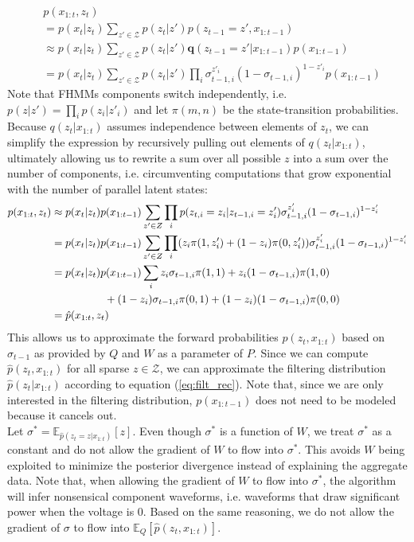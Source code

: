 \begin{align*}
&p(x_{1:t},z_t) \\
&= p(x_t|z_t) \sum_{z' \in \mathcal{Z}} p(z_t|z') p(z_{t-1} = z', x_{1:t-1})\\
			&\approx p(x_t|z_t) \sum_{z' \in \mathcal{Z}} p(z_t|z') \boldsymbol{q}(z_{t-1} = z'|x_{1:t-1})p(x_{1:t-1})\\
			&= p(x_t|z_t) \sum_{z' \in \mathcal{Z}} p(z_t|z') \prod_i \sigma_{t-1,i}^{z'_i} (1-\sigma_{t-1,i})^{1-z'_i}p(x_{1:t-1})
\end{align*}
Note that FHMMs components switch independently, i.e. $p(z|z') = \prod_i p(z_i | z'_i)$ and let $\pi(m,n)$ be the state-transition probabilities. Because $q(z_{t}|x_{1:t})$ assumes independence between elements of $z_{t}$, we can simplify the expression by recursively pulling out elements of $q(z_{t}|x_{1:t})$, ultimately allowing us to rewrite a sum over all possible $z$ into a sum over the number of components, i.e. circumventing computations that grow exponential with the number of parallel latent states:
\begin{align*}
p(x_{1:t},z_t)&\approx p(x_t| z_t)p(x_{1:t-1})\sum_{z' \in Z} \prod_i p(z_{t,i} = z_i | z_{t-1,i} = z'_i) \sigma_{t-1,i}^{z'_i} (1-\sigma_{t-1,i})^{1-z'_i}\\
&=p(x_t|z_t)p(x_{1:t-1})\sum_{z' \in Z} \prod_i (z_i \pi(1 , z'_i) + (1-z_i) \pi(0 ,z'_i))\sigma_{t-1,i}^{z'_i} (1-\sigma_{t-1,i})^{1-z'_i} \\
&= p(x_t|z_t)p(x_{1:t-1})\sum_{i}z_i\sigma_{t-1,i} \pi(1 , 1)+ z_i (1- \sigma_{t-1,i}) \pi(1 , 0) \\
  &\text{\ \ \ \ \ \ \ \ \ \ \ \ \ \ \ }\text{\vspace{1in}}  +(1-z_i) \sigma_{t-1,i} \pi(0, 1) + (1-z_i)(1- \sigma_{t-1,i}) \pi(0, 0)\\
&= \hat{p}(x_{1:t}, z_t)
\end{align*}
This allows us to approximate the forward probabilities $p(z_t, x_{1:t})$ based on $\sigma_{t-1}$ as provided by $Q$ and $W$ as a parameter of $P$. Since we can compute $\hat{p}(z_t, x_{1:t})$ for all sparse $z \in \mathcal{Z}$, we can approximate the filtering distribution $\hat{p}(z_t | x_{1:t})$ according to equation (\ref{eq:filt_rec}). Note that, since we are only interested in the filtering distribution, $p(x_{1:t-1})$ does not need to be modeled because it cancels out.\\ Let $\sigma^* = \mathbb{E}_{\hat{p}(z_t = z | x_{1:t})}[z]$. Even though $\sigma^*$ is a function of $W$, we treat $\sigma^*$ as a constant and do not allow the gradient of $W$ to flow into $\sigma^*$. This avoids $W$ being exploited to minimize the posterior divergence instead of explaining the aggregate data. Note that, when allowing the gradient of $W$ to flow into $\sigma^*$, the algorithm will infer nonsensical component waveforms, i.e. waveforms that draw significant power when the voltage is $0$. Based on the same reasoning, we do not allow the gradient of $\sigma$ to flow into $\mathbb{E}_Q[\hat{p}(z_t, x_{1:t})]$.\\
